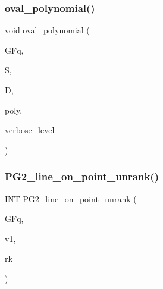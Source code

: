 \subsubsection{\texorpdfstring{oval\+\_\+polynomial()}{oval\_polynomial()}}
{\footnotesize\ttfamily void oval\+\_\+polynomial (\begin{DoxyParamCaption}\item[{\mbox{\hyperlink{classfinite__field}{finite\+\_\+field}} \&}]{G\+Fq,  }\item[{\mbox{\hyperlink{galois_8h_a09fddde158a3a20bd2dcadb609de11dc}{I\+NT}} $\ast$}]{S,  }\item[{\mbox{\hyperlink{classunipoly__domain}{unipoly\+\_\+domain}} \&}]{D,  }\item[{\mbox{\hyperlink{galois_8h_a77ca58de3d2da6172242493dd9c8aaa8}{unipoly\+\_\+object}} \&}]{poly,  }\item[{\mbox{\hyperlink{galois_8h_a09fddde158a3a20bd2dcadb609de11dc}{I\+NT}}}]{verbose\+\_\+level }\end{DoxyParamCaption})}

\mbox{\label{projective_8_c_ae692d09e8b7648400eec1e5f0c74d885}} 
\subsubsection{\texorpdfstring{P\+G2\+\_\+line\+\_\+on\+\_\+point\+\_\+unrank()}{PG2\_line\_on\_point\_unrank()}}
{\footnotesize\ttfamily \mbox{\hyperlink{galois_8h_a09fddde158a3a20bd2dcadb609de11dc}{I\+NT}} P\+G2\+\_\+line\+\_\+on\+\_\+point\+\_\+unrank (\begin{DoxyParamCaption}\item[{\mbox{\hyperlink{classfinite__field}{finite\+\_\+field}} \&}]{G\+Fq,  }\item[{\mbox{\hyperlink{galois_8h_a09fddde158a3a20bd2dcadb609de11dc}{I\+NT}} $\ast$}]{v1,  }\item[{\mbox{\hyperlink{galois_8h_a09fddde158a3a20bd2dcadb609de11dc}{I\+NT}}}]{rk }\end{DoxyParamCaption})}

\mbox{\label{projective_8_c_acf0404442ae6ad7309ed21a5fd2748f5}} 
